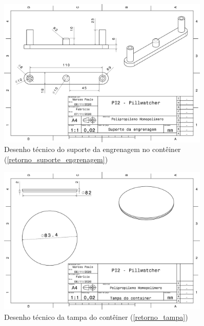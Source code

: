 \begin{apendicesenv}
\begin{figure}[H]
    \centering
    \includegraphics[width=0.9\textwidth]{figuras/estrutura/Desenhos/Suporte_Engrenagem_Container.pdf}
    \caption{Desenho técnico do suporte da engrenagem no contêiner (\ref{retorno_suporte_engrenagem})}
    \label{fig:supp_engrenagem}
\end{figure}

\begin{figure}[H]
    \centering
    \includegraphics[width=0.9\textwidth]{figuras/estrutura/Desenhos/Tampa_Container.pdf}
    \caption{Desenho técnico da tampa do contêiner (\ref{retorno_tampa})}
    \label{fig:tampa}
\end{figure}


\end{apendicesenv}
